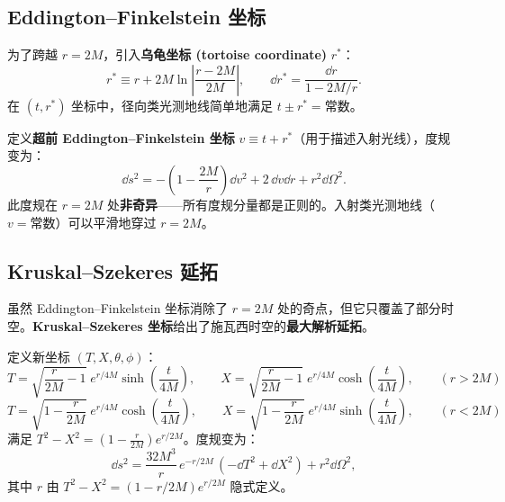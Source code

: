 \subsection{Eddington–Finkelstein 坐标}

为了跨越 $r=2M$，引入\textbf{乌龟坐标 (tortoise coordinate)} $r^*$：
\begin{equation}
    r^* \equiv r + 2M\ln\left|\frac{r-2M}{2M}\right|, \qquad \dd r^* = \frac{\dd r}{1-2M/r}.
\end{equation}
在 $(t,r^*)$ 坐标中，径向类光测地线简单地满足 $t \pm r^* = \text{常数}$。

定义\textbf{超前 Eddington–Finkelstein 坐标} $v \equiv t + r^*$（用于描述入射光线），度规变为：
\begin{equation}
    \boxed{\dd s^2 = -\left(1 - \frac{2M}{r}\right) \dd v^2 + 2\,\dd v\dd r + r^2 \dd\Omega^2}.
    \label{eq:EF_metric}
\end{equation}
此度规在 $r=2M$ 处\textbf{非奇异}——所有度规分量都是正则的。入射类光测地线（$v=\text{常数}$）可以平滑地穿过 $r=2M$。

\subsection{Kruskal–Szekeres 延拓}

虽然 Eddington–Finkelstein 坐标消除了 $r=2M$ 处的奇点，但它只覆盖了部分时空。\textbf{Kruskal–Szekeres 坐标}给出了施瓦西时空的\textbf{最大解析延拓}。

\begin{definition}
定义新坐标 $(T,X,\theta,\phi)$：
\begin{equation}
    T = \sqrt{\frac{r}{2M}-1}\; e^{r/4M} \sinh\!\left(\frac{t}{4M}\right), \qquad
    X = \sqrt{\frac{r}{2M}-1}\; e^{r/4M} \cosh\!\left(\frac{t}{4M}\right), \qquad (r > 2M)
\end{equation}
\begin{equation}
    T = \sqrt{1-\frac{r}{2M}}\; e^{r/4M} \cosh\!\left(\frac{t}{4M}\right), \qquad
    X = \sqrt{1-\frac{r}{2M}}\; e^{r/4M} \sinh\!\left(\frac{t}{4M}\right), \qquad (r < 2M)
\end{equation}
满足 $T^2 - X^2 = \left(1 - \frac{r}{2M}\right)e^{r/2M}$。度规变为：
\begin{equation}
    \boxed{\dd s^2 = \frac{32M^3}{r}\, e^{-r/2M}\,(-\dd T^2 + \dd X^2) + r^2 \dd\Omega^2},
    \label{eq:KS_metric}
\end{equation}
其中 $r$ 由 $T^2 - X^2 = (1-r/2M)e^{r/2M}$ 隐式定义。
\end{definition}


